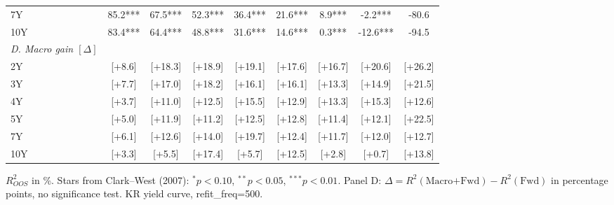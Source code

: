 \begin{table}[ht]
\begin{tabular}{lcccccccc}
7Y & 85.2*** & 67.5*** & 52.3*** & 36.4*** & 21.6*** & 8.9*** & -2.2*** & -80.6 \\
10Y & 83.4*** & 64.4*** & 48.8*** & 31.6*** & 14.6*** & 0.3*** & -12.6*** & -94.5 \\
\midrule
\textit{D. Macro gain $[\Delta]$} \\
2Y & [+8.6] & [+18.3] & [+18.9] & [+19.1] & [+17.6] & [+16.7] & [+20.6] & [+26.2] \\
3Y & [+7.7] & [+17.0] & [+18.2] & [+16.1] & [+16.1] & [+13.3] & [+14.9] & [+21.5] \\
4Y & [+3.7] & [+11.0] & [+12.5] & [+15.5] & [+12.9] & [+13.3] & [+15.3] & [+12.6] \\
5Y & [+5.0] & [+11.9] & [+11.2] & [+12.5] & [+12.8] & [+11.4] & [+12.1] & [+22.5] \\
7Y & [+6.1] & [+12.6] & [+14.0] & [+19.7] & [+12.4] & [+11.7] & [+12.0] & [+12.7] \\
10Y & [+3.3] & [+5.5] & [+17.4] & [+5.7] & [+12.5] & [+2.8] & [+0.7] & [+13.8] \\
\bottomrule
\end{tabular}
\begin{tablenotes}\footnotesize\item $R^2_{OOS}$ in \%. Stars from Clark--West (2007): $^{*}p<0.10$, $^{**}p<0.05$, $^{***}p<0.01$. Panel D: $\Delta = R^2(\text{Macro+Fwd}) - R^2(\text{Fwd})$ in percentage points, no significance test. KR yield curve, refit\_freq=500.\end{tablenotes}
\end{table}